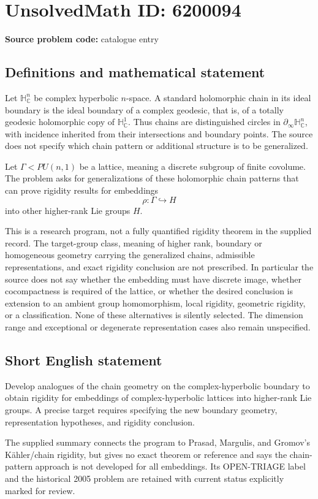 \documentclass[11pt]{article}
\newcommand{\C}{\mathbb{C}}
\begin{document}
\section*{UnsolvedMath ID: 6200094}
\textbf{Source problem code:} catalogue entry
\subsection{Definitions and mathematical statement}
Let $\mathbb H^n_{\C}$ be complex hyperbolic $n$-space. A standard holomorphic chain in its ideal boundary is the ideal boundary of a complex geodesic, that is, of a totally geodesic holomorphic copy of $\mathbb H^1_{\C}$. Thus chains are distinguished circles in $\partial_\infty\mathbb H^n_{\C}$, with incidence inherited from their intersections and boundary points. The source does not specify which chain pattern or additional structure is to be generalized.

Let $\Gamma<PU(n,1)$ be a lattice, meaning a discrete subgroup of finite covolume. The problem asks for generalizations of these holomorphic chain patterns that can prove rigidity results for embeddings
\[
 \rho:\Gamma\hookrightarrow H
\]
into other higher-rank Lie groups $H$.

This is a research program, not a fully quantified rigidity theorem in the supplied record. The target-group class, meaning of higher rank, boundary or homogeneous geometry carrying the generalized chains, admissible representations, and exact rigidity conclusion are not prescribed. In particular the source does not say whether the embedding must have discrete image, whether cocompactness is required of the lattice, or whether the desired conclusion is extension to an ambient group homomorphism, local rigidity, geometric rigidity, or a classification. None of these alternatives is silently selected. The dimension range and exceptional or degenerate representation cases also remain unspecified.
\subsection{Short English statement}
Develop analogues of the chain geometry on the complex-hyperbolic boundary to obtain rigidity for embeddings of complex-hyperbolic lattices into higher-rank Lie groups. A precise target requires specifying the new boundary geometry, representation hypotheses, and rigidity conclusion.

The supplied summary connects the program to Prasad, Margulis, and Gromov's Kähler/chain rigidity, but gives no exact theorem or reference and says the chain-pattern approach is not developed for all embeddings. Its OPEN-TRIAGE label and the historical 2005 problem are retained with current status explicitly marked for review.
\end{document}
